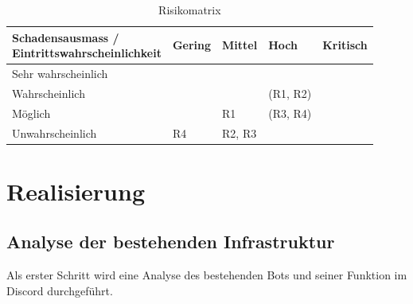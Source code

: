 \documentclass[a4paper, table]{article}
\begin{document}
\begin{table}[h]
    \centering
    \begin{tabular}{|l|p{2cm}|p{2cm}|p{2cm}|p{2cm}|}
        \hline
        \shortstack[c]{Schadensausmass / \\ Eintrittswahrscheinlichkeit} & Gering & Mittel & Hoch & Kritisch \\[10pt]
        \hline
        Sehr wahrscheinlich & \cellcolor{yellow!50} & \cellcolor{orange!50} & \cellcolor{red!50} & \cellcolor{red!50} \\[10pt]
        \hline
        Wahrscheinlich & \cellcolor{yellow!50} & \cellcolor{yellow!50}& \cellcolor{orange!50}(R1, R2) & \cellcolor{red!50} \\[10pt]
        \hline
        Möglich & \cellcolor{green!50} & \cellcolor{yellow!50}R1 & \cellcolor{yellow!50}(R3, R4) & \cellcolor{orange!50} \\[10pt]
        \hline
        Unwahrscheinlich & \cellcolor{green!50}R4 & \cellcolor{green!50}R2, R3 & \cellcolor{yellow!50} & \cellcolor{yellow!50} \\[10pt]
        \hline
    \end{tabular}
    \caption{Risikomatrix}
    \label{tab: Riskmatrix}
\end{table}

\clearpage
\section{Realisierung}\label{implementation}

\subsection{Analyse der bestehenden Infrastruktur}
Als erster Schritt wird eine Analyse des bestehenden Bots und seiner Funktion im Discord durchgeführt.
\end{document}
